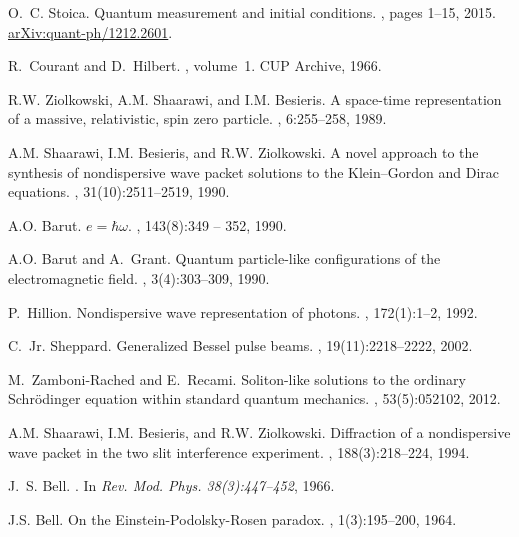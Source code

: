 \documentclass[11pt]{amsart}
\theoremstyle{definition}
\theoremstyle{plain}
\begin{document}
\begin{thebibliography}{10}
O.~C. Stoica.
\newblock Quantum measurement and initial conditions.
, pages 1--15, 2015.
\newblock \href{http://arxiv.org/abs/1212.2601}{arXiv:quant-ph/1212.2601}.

R.~Courant and D.~Hilbert.
, volume~1.
\newblock CUP Archive, 1966.

R.W. Ziolkowski, A.M. Shaarawi, and I.M. Besieris.
\newblock A space-time representation of a massive, relativistic, spin zero
  particle.
, 6:255--258, 1989.

A.M. Shaarawi, I.M. Besieris, and R.W. Ziolkowski.
\newblock A novel approach to the synthesis of nondispersive wave packet
  solutions to the {K}lein--{G}ordon and {D}irac equations.
, 31(10):2511--2519, 1990.

A.O. Barut.
\newblock $e=\hbar\omega$.
, 143(8):349 -- 352, 1990.

A.O. Barut and A.~Grant.
\newblock Quantum particle-like configurations of the electromagnetic field.
, 3(4):303--309, 1990.

P.~Hillion.
\newblock Nondispersive wave representation of photons.
, 172(1):1--2, 1992.

C.~Jr. Sheppard.
\newblock Generalized {B}essel pulse beams.
, 19(11):2218--2222, 2002.

M.~Zamboni-Rached and E.~Recami.
\newblock Soliton-like solutions to the ordinary {S}chr{\"o}dinger equation
  within standard quantum mechanics.
, 53(5):052102, 2012.

A.M. Shaarawi, I.M. Besieris, and R.W. Ziolkowski.
\newblock Diffraction of a nondispersive wave packet in the two slit
  interference experiment.
, 188(3):218--224, 1994.

J.~S. Bell.
.
\newblock In {\em {Rev. Mod. Phys. 38(3):447--452}}, 1966.

J.S. Bell.
\newblock On the {E}instein-{P}odolsky-{R}osen paradox.
, 1(3):195--200, 1964.


\end{thebibliography}
\end{document}
